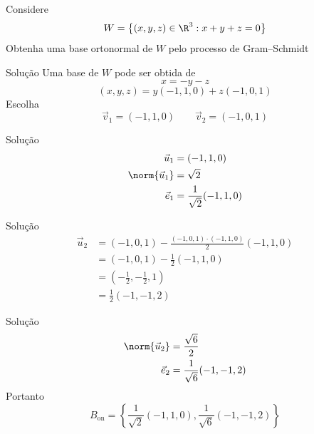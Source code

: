 \begin{question}
  Considere
  \[
  W=
  \left\{
  (x,y,z)\in\R^3
  :
  x+y+z=0
  \right\}
  \]
  Obtenha uma base ortonormal de $W$ pelo processo de Gram--Schmidt
\end{question}

\begin{resolution}{Solução}
Uma base de $W$ pode ser obtida de
\[
x=-y-z
\]
\[
(x,y,z)
=
y(-1,1,0)
+
z(-1,0,1)
\]
Escolha
\[
\vec{v}_1=(-1,1,0)
\qquad
\vec{v}_2=(-1,0,1)
\]
\end{resolution}

\begin{resolution}{Solução}
\begin{align*}
\vec{u}_1
&=(-1,1,0)\\
\norm{\vec{u}_1}
&=\sqrt{2}\\
\vec{e}_1
&=
\frac{1}{\sqrt{2}}(-1,1,0)
\end{align*}
\end{resolution}

\begin{resolution}{Solução}
\begin{align*}
\vec{u}_2
&=
(-1,0,1)
-
\frac{(-1,0,1)\cdot(-1,1,0)}
{2}
(-1,1,0)\\
&=
(-1,0,1)
-
\frac{1}{2}(-1,1,0)\\
&=
\left(
-\frac{1}{2},
-\frac{1}{2},
1
\right)\\
&=
\frac{1}{2}(-1,-1,2)
\end{align*}
\end{resolution}

\begin{resolution}{Solução}
\begin{align*}
\norm{\vec{u}_2}
&=
\frac{\sqrt{6}}{2}\\
\vec{e}_2
&=
\frac{1}{\sqrt{6}}(-1,-1,2)
\end{align*}
Portanto
\[
B_{\mathrm{on}}
=
\left\{
\frac{1}{\sqrt{2}}(-1,1,0)
,
\frac{1}{\sqrt{6}}(-1,-1,2)
\right\}
\]
\end{resolution}

\endinput
